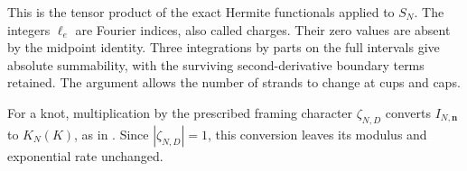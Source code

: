 This is the tensor product of the exact Hermite functionals applied
to $S_N$. The integers $\ell_e$ are Fourier indices, also called
charges. Their zero values are absent by the midpoint identity.
Three integrations by parts on the full intervals give absolute
summability, with the surviving second-derivative boundary terms
retained. The argument allows the number of strands to change at
cups and caps.

For a knot, multiplication by the prescribed framing character
$\zeta_{N,D}$ converts $I_{N,\boldsymbol n}$ to $K_N(K)$, as in
\cite[Theorem 10.1]{Finite}. Since $|\zeta_{N,D}|=1$, this conversion
leaves its modulus and exponential rate unchanged.

